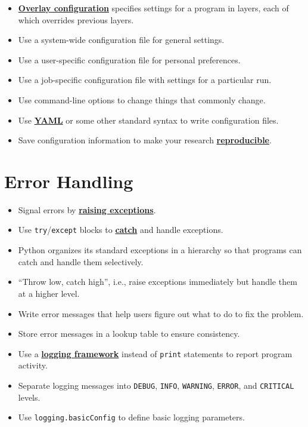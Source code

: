 \documentclass[
]{krantz}
\providecommand{\tightlist}{%
  \setlength{\itemsep}{0pt}\setlength{\parskip}{0pt}}
\newcommand{\gref}[2]{\hyperlink{#2}{\textbf{#1}}}
\begin{document}
\begin{itemize}
\tightlist
\item
  \gref{Overlay configuration}{overlay\_configuration} specifies settings for a program in layers,
  each of which overrides previous layers.
\item
  Use a system-wide configuration file for general settings.
\item
  Use a user-specific configuration file for personal preferences.
\item
  Use a job-specific configuration file with settings for a particular run.
\item
  Use command-line options to change things that commonly change.
\item
  Use \gref{YAML}{yaml\_glossary} or some other standard syntax to write configuration files.
\item
  Save configuration information to make your research \gref{reproducible}{reproducible\_research}.
\end{itemize}

\hypertarget{error-handling-1}{%
\section{Error Handling}\label{error-handling-1}}

\begin{itemize}
\tightlist
\item
  Signal errors by \gref{raising exceptions}{raise\_exception}.
\item
  Use \texttt{try}/\texttt{except} blocks to \gref{catch}{catch\_exception} and handle exceptions.
\item
  Python organizes its standard exceptions in a hierarchy so that programs can catch and handle them selectively.
\item
  ``Throw low, catch high'', i.e., raise exceptions immediately but handle them at a higher level.
\item
  Write error messages that help users figure out what to do to fix the problem.
\item
  Store error messages in a lookup table to ensure consistency.
\item
  Use a \gref{logging framework}{logging\_framework} instead of \texttt{print} statements to report program activity.
\item
  Separate logging messages into \texttt{DEBUG}, \texttt{INFO}, \texttt{WARNING}, \texttt{ERROR}, and \texttt{CRITICAL} levels.
\item
  Use \texttt{logging.basicConfig} to define basic logging parameters.
\end{itemize}
\end{document}
